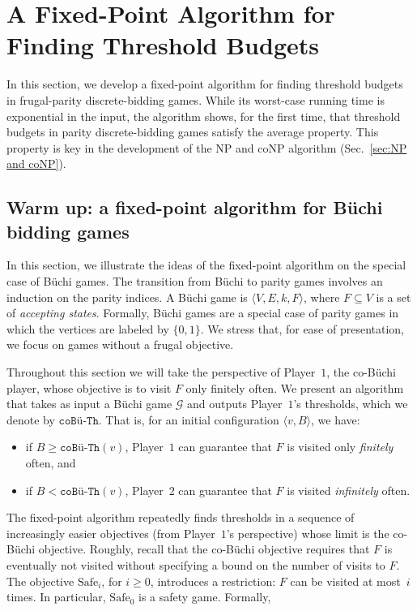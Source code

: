 \documentclass{article}\providecommand{\nequiv}{\not\equiv}\usepackage[a4paper,margin=20mm]{geometry}
\newcommand{\PO}{Player~$1$\xspace}
\newcommand{\PT}{Player~$2$\xspace}
\newcommand{\G}{{\mathcal G}}
\newcommand{\coTh}{\texttt{coB\"u-Th}}
\newcommand{\safe}{\text{Safe}}
\newcommand{\zug}[1]{\langle #1  \rangle}
\renewcommand{\set}[1]{\{ #1  \}}
\begin{document}
\section{A Fixed-Point Algorithm for Finding Threshold Budgets}
In this section, we develop a fixed-point algorithm for finding threshold budgets in frugal-parity discrete-bidding games. While its worst-case running time is exponential in the input, the algorithm shows, for the first time, that threshold budgets in parity discrete-bidding games satisfy the average property. This property is key in the development of the NP and coNP algorithm (Sec.~\ref{sec:NP and coNP}). 


\subsection{Warm up: a fixed-point algorithm for B\"uchi bidding games}
\label{sec:Buchi}
In this section, we illustrate the ideas of the fixed-point algorithm on the special case of B\"uchi games. The transition from B\"uchi to parity games involves an induction on the parity indices. A B\"uchi game is $\zug{V, E, k, F}$, where $F \subseteq V$ is a set of {\em accepting states}. Formally, B\"uchi games are a special case of parity games in which the vertices are labeled by $\set{0,1}$. We stress that, for ease of presentation, we focus on games without a frugal objective.

Throughout this section we will take the perspective of \PO, the co-B\"uchi player, whose objective is to visit $F$ only finitely often. We present an algorithm that takes as input a B\"uchi game $\G$ and outputs \PO's thresholds, which we denote by $\coTh$. That is, for an initial configuration $\zug{v, B}$, we have:
\begin{itemize}
\item if $B \geq \coTh(v)$, \PO can guarantee that $F$ is visited only {\em finitely} often, and
\item if $B < \coTh(v)$, \PT can guarantee that $F$ is visited {\em infinitely} often.
\end{itemize}

The fixed-point algorithm repeatedly finds thresholds in a sequence of increasingly easier objectives (from \PO's perspective) whose limit is the co-B\"uchi objective. 
Roughly, recall that the co-B\"uchi objective requires that $F$ is eventually not visited without specifying a bound on the number of visits to $F$. The objective $\safe_i$, for $i \geq 0$, introduces a restriction: $F$ can be visited at most~$i$ times. In particular, $\safe_0$ is a safety game. Formally, 
\end{document}
